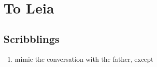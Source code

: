 \chapter{To Leia}

\section{Scribblings}

\begin{enumerate}
\item mimic the conversation with the father, except %
\end{enumerate}
